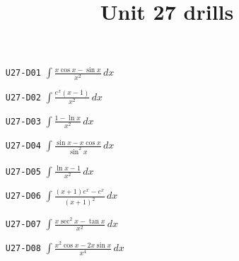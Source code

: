 \title{Unit 27 drills}\maketitle\begin{enumerate}
  \item[\texttt{U27-D01}] $\displaystyle \int\frac{x\cos x-\sin x}{x^{2}}\,dx$
  \item[\texttt{U27-D02}] $\displaystyle \int\frac{e^{x}(x-1)}{x^{2}}\,dx$
  \item[\texttt{U27-D03}] $\displaystyle \int\frac{1-\ln x}{x^{2}}\,dx$
  \item[\texttt{U27-D04}] $\displaystyle \int\frac{\sin x-x\cos x}{\sin^{2}x}\,dx$
  \item[\texttt{U27-D05}] $\displaystyle \int\frac{\ln x-1}{x^{2}}\,dx$
  \item[\texttt{U27-D06}] $\displaystyle \int\frac{(x+1)e^{x}-e^{x}}{(x+1)^{2}}\,dx$
  \item[\texttt{U27-D07}] $\displaystyle \int\frac{x\sec^{2}x-\tan x}{x^{2}}\,dx$
  \item[\texttt{U27-D08}] $\displaystyle \int\frac{x^{2}\cos x-2x\sin x}{x^{4}}\,dx$
\end{enumerate}
